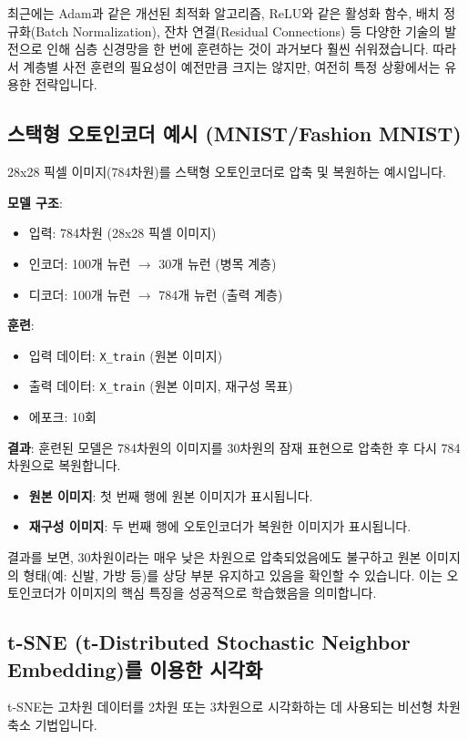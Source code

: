 \documentclass[11pt,a4paper]{article}
\theoremstyle{definition}
\begin{document}
\begin{warningbox}
최근에는 Adam과 같은 개선된 최적화 알고리즘, ReLU와 같은 활성화 함수, 배치 정규화(Batch Normalization), 잔차 연결(Residual Connections) 등 다양한 기술의 발전으로 인해 심층 신경망을 한 번에 훈련하는 것이 과거보다 훨씬 쉬워졌습니다. 따라서 계층별 사전 훈련의 필요성이 예전만큼 크지는 않지만, 여전히 특정 상황에서는 유용한 전략입니다.
\end{warningbox}

\subsection{스택형 오토인코더 예시 (MNIST/Fashion MNIST)}
28x28 픽셀 이미지(784차원)를 스택형 오토인코더로 압축 및 복원하는 예시입니다.

\begin{examplebox}
\textbf{모델 구조}:
\begin{itemize}
    \item 입력: 784차원 (28x28 픽셀 이미지)
    \item 인코더: 100개 뉴런 $\rightarrow$ 30개 뉴런 (병목 계층)
    \item 디코더: 100개 뉴런 $\rightarrow$ 784개 뉴런 (출력 계층)
\end{itemize}

\textbf{훈련}:
\begin{itemize}
    \item 입력 데이터: \texttt{X_train} (원본 이미지)
    \item 출력 데이터: \texttt{X_train} (원본 이미지, 재구성 목표)
    \item 에포크: 10회
\end{itemize}

\textbf{결과}:
훈련된 모델은 784차원의 이미지를 30차원의 잠재 표현으로 압축한 후 다시 784차원으로 복원합니다.
\begin{itemize}
    \item \textbf{원본 이미지}: 첫 번째 행에 원본 이미지가 표시됩니다.
    \item \textbf{재구성 이미지}: 두 번째 행에 오토인코더가 복원한 이미지가 표시됩니다.
\end{itemize}
결과를 보면, 30차원이라는 매우 낮은 차원으로 압축되었음에도 불구하고 원본 이미지의 형태(예: 신발, 가방 등)를 상당 부분 유지하고 있음을 확인할 수 있습니다. 이는 오토인코더가 이미지의 핵심 특징을 성공적으로 학습했음을 의미합니다.
\end{examplebox}

\newpage
\subsection{t-SNE (t-Distributed Stochastic Neighbor Embedding)를 이용한 시각화}
t-SNE는 고차원 데이터를 2차원 또는 3차원으로 시각화하는 데 사용되는 비선형 차원 축소 기법입니다.
\end{document}
